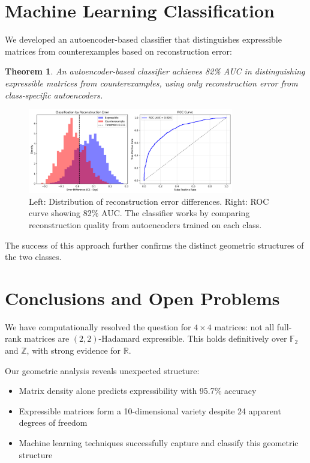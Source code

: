 \documentclass[11pt]{amsart}
\theoremstyle{plain}
\newtheorem{theorem}{Theorem}
\theoremstyle{definition}
\theoremstyle{remark}
\begin{document}
\section{Machine Learning Classification}

We developed an autoencoder-based classifier that distinguishes expressible matrices from counterexamples based on reconstruction error:

\begin{theorem}
An autoencoder-based classifier achieves 82\% AUC in distinguishing expressible matrices from counterexamples, using only reconstruction error from class-specific autoencoders.
\end{theorem}

\begin{figure}[H]
\centering
\includegraphics[width=0.8\textwidth]{autoencoder_classifier.png}
\caption{Left: Distribution of reconstruction error differences. Right: ROC curve showing 82\% AUC. The classifier works by comparing reconstruction quality from autoencoders trained on each class.}
\end{figure}

The success of this approach further confirms the distinct geometric structures of the two classes.

\section{Conclusions and Open Problems}

We have computationally resolved the question for $4 \times 4$ matrices: not all full-rank matrices are $(2,2)$-Hadamard expressible. This holds definitively over $\mathbb{F}_2$ and $\mathbb{Z}$, with strong evidence for $\mathbb{R}$.

Our geometric analysis reveals unexpected structure:
\begin{itemize}
\item Matrix density alone predicts expressibility with 95.7\% accuracy
\item Expressible matrices form a 10-dimensional variety despite 24 apparent degrees of freedom
\item Machine learning techniques successfully capture and classify this geometric structure
\end{itemize}
\end{document}
